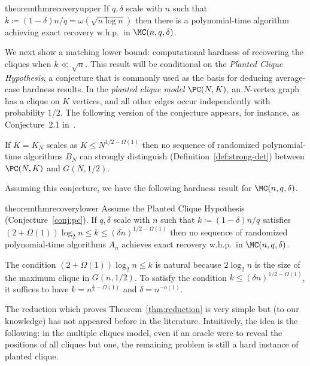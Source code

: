 \documentclass{article}
\begin{document}
\begin{restatable}{theorem}{thmrecoveryupper}
\label{thm:exact_MC_algo}
If $q,\delta$ scale with $n$ such that $k \coloneqq (1-\delta)n/q = \omega(\sqrt{n \log n})$ then there is a polynomial-time algorithm achieving exact recovery w.h.p.\ in $\MC(n,q,\delta)$.
\end{restatable}

We next show a matching lower bound: computational hardness of recovering the cliques when $k \ll \sqrt{n}$. This result will be conditional on the \emph{Planted Clique Hypothesis}, a conjecture that is commonly used as the basis for deducing average-case hardness results. In the \emph{planted clique model} $\PC(N,K)$, an $N$-vertex graph has a clique on $K$ vertices, and all other edges occur independently with probability $1/2$. The following version of the conjecture appears, for instance, as Conjecture~2.1 in~\cite{BBH-reductions}.


\begin{conjecture}
\label{conj:pc}
If $K = K_N$ scales as $K \le N^{1/2 - \Omega(1)}$ then no sequence of randomized polynomial-time algorithms $B_N$ can strongly distinguish (Definition~\ref{def:strong-det}) between $\PC(N,K)$ and $G(N,1/2)$.
\end{conjecture}

Assuming this conjecture, we have the following hardness result for $\MC(n,q,\delta)$.

\begin{restatable}{theorem}{thmrecoverylower}
\label{thm:reduction}
Assume the Planted Clique Hypothesis (Conjecture~\ref{conj:pc}). If $q,\delta$ scale with $n$ such that $k \coloneqq (1-\delta)n/q$ satisfies $(2+\Omega(1)) \log_2 n \le k \le (\delta n)^{1/2 - \Omega(1)}$ then no sequence of randomized polynomial-time algorithms $A_n$ achieves exact recovery w.h.p.\ in $\MC(n,q,\delta)$.
\end{restatable}

\noindent The condition $(2+\Omega(1)) \log_2 n \le k$ is natural because $2\log_2 n$ is the size of the maximum clique in $G(n,1/2)$. To satisfy the condition $k \le (\delta n)^{1/2-\Omega(1)}$, it suffices to have $k = n^{\frac{1}{2} - \Omega(1)}$ and $\delta = n^{-o(1)}$.

The reduction which proves Theorem~\ref{thm:reduction} is very simple but (to our knowledge) has not appeared before in the literature. Intuitively, the idea is the following: in the multiple cliques model, even if an oracle were to reveal the positions of all cliques but one, the remaining problem is still a hard instance of planted clique.
\end{document}
